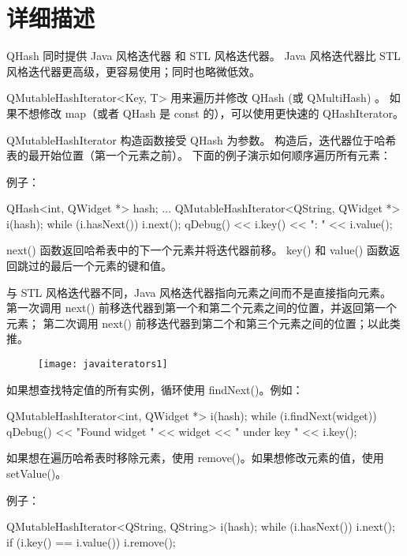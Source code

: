 \section{详细描述}

QHash 同时提供 Java 风格迭代器 和 STL 风格迭代器。
Java 风格迭代器比 STL 风格迭代器更高级，更容易使用；同时也略微低效。

QMutableHashIterator<Key, T> 用来遍历并修改 QHash (或 QMultiHash) 。
如果不想修改 map（或者 QHash 是 const 的），可以使用更快速的 QHashIterator。

QMutableHashIterator 构造函数接受 QHash 为参数。
构造后，迭代器位于哈希表的最开始位置（第一个元素之前）。
下面的例子演示如何顺序遍历所有元素：

例子：

\begin{cppcode}
QHash<int, QWidget *> hash;
...
QMutableHashIterator<QString, QWidget *> i(hash);
while (i.hasNext()) {
    i.next();
    qDebug() << i.key() << ": " << i.value();
}
\end{cppcode}

next() 函数返回哈希表中的下一个元素并将迭代器前移。
key() 和 value() 函数返回跳过的最后一个元素的键和值。

与 STL 风格迭代器不同，Java 风格迭代器指向元素之间而不是直接指向元素。
第一次调用 next() 前移迭代器到第一个和第二个元素之间的位置，并返回第一个元素；
第二次调用 next() 前移迭代器到第二个和第三个元素之间的位置；以此类推。

\begin{figure}[hbt!]  
	\centering
    \texttt{[image: javaiterators1]}
\end{figure}


如果想查找特定值的所有实例，循环使用 findNext()。例如：

\begin{cppcode}
QMutableHashIterator<int, QWidget *> i(hash);
while (i.findNext(widget)) {
    qDebug() << "Found widget " << widget << " under key "
             << i.key();
}
\end{cppcode}

如果想在遍历哈希表时移除元素，使用 remove()。如果想修改元素的值，使用 setValue()。

例子：

\begin{cppcode}
QMutableHashIterator<QString, QString> i(hash);
while (i.hasNext()) {
    i.next();
    if (i.key() == i.value())
        i.remove();
}
\end{cppcode}

